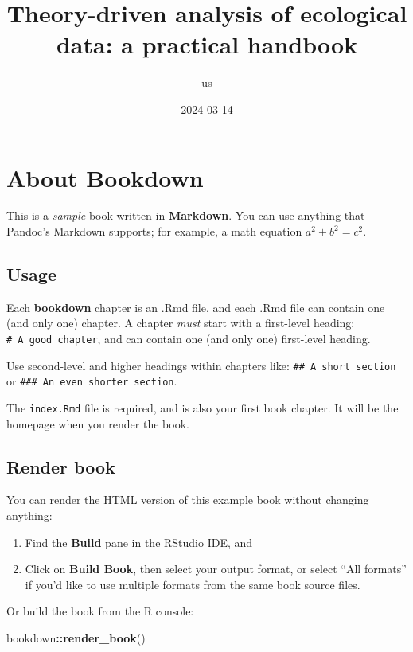 \documentclass[
]{book}
\title{Theory-driven analysis of ecological data: a practical handbook}
\author{us}
\date{2024-03-14}
\newenvironment{Shaded}{\begin{snugshade}}{\end{snugshade}}
\newcommand{\FunctionTok}[1]{\textcolor[rgb]{0.13,0.29,0.53}{\textbf{#1}}}
\newcommand{\NormalTok}[1]{#1}
\newcommand{\SpecialCharTok}[1]{\textcolor[rgb]{0.81,0.36,0.00}{\textbf{#1}}}
\theoremstyle{definition}
\theoremstyle{definition}
\theoremstyle{definition}
\theoremstyle{definition}
\theoremstyle{remark}
\begin{document}
\maketitle

{
\setcounter{tocdepth}{1}
\tableofcontents
}
\chapter{About Bookdown}\label{about-bookdown}

This is a \emph{sample} book written in \textbf{Markdown}. You can use anything that Pandoc's Markdown supports; for example, a math equation \(a^2 + b^2 = c^2\).

\section{Usage}\label{usage}

Each \textbf{bookdown} chapter is an .Rmd file, and each .Rmd file can contain one (and only one) chapter. A chapter \emph{must} start with a first-level heading: \texttt{\#\ A\ good\ chapter}, and can contain one (and only one) first-level heading.

Use second-level and higher headings within chapters like: \texttt{\#\#\ A\ short\ section} or \texttt{\#\#\#\ An\ even\ shorter\ section}.

The \texttt{index.Rmd} file is required, and is also your first book chapter. It will be the homepage when you render the book.

\section{Render book}\label{render-book}

You can render the HTML version of this example book without changing anything:

\begin{enumerate}
\def\labelenumi{\arabic{enumi}.}
\item
  Find the \textbf{Build} pane in the RStudio IDE, and
\item
  Click on \textbf{Build Book}, then select your output format, or select ``All formats'' if you'd like to use multiple formats from the same book source files.
\end{enumerate}

Or build the book from the R console:

\begin{Shaded}
\begin{Highlighting}[]
\NormalTok{bookdown}\SpecialCharTok{::}\FunctionTok{render\_book}\NormalTok{()}
\end{Highlighting}
\end{Shaded}
\end{document}
